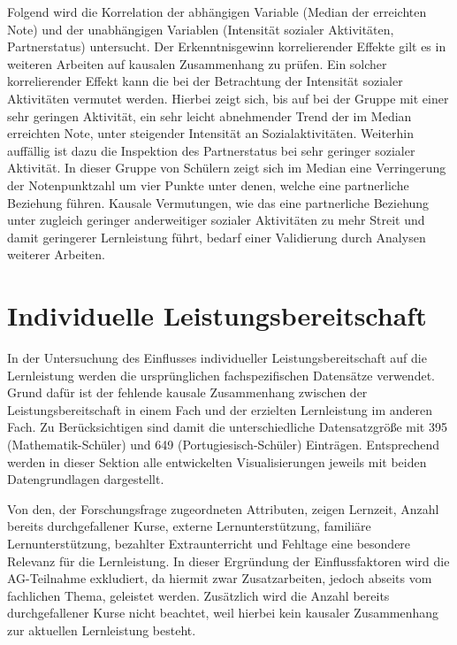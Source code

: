 Folgend wird die Korrelation der abhängigen Variable ({Median der erreichten Note}) und der unabhängigen Variablen ({Intensität sozialer Aktivitäten}, {Partnerstatus}) untersucht.
Der Erkenntnisgewinn korrelierender Effekte gilt es in weiteren Arbeiten auf kausalen Zusammenhang zu prüfen.
Ein solcher korrelierender Effekt kann die bei der Betrachtung der Intensität sozialer Aktivitäten vermutet werden. 
Hierbei zeigt sich, bis auf bei der Gruppe mit einer sehr geringen Aktivität, ein sehr leicht abnehmender Trend der im Median erreichten Note, unter steigender Intensität an Sozialaktivitäten.
Weiterhin auffällig ist dazu die Inspektion des Partnerstatus bei sehr geringer sozialer Aktivität.
In dieser Gruppe von Schülern zeigt sich im Median eine Verringerung der Notenpunktzahl um vier Punkte unter denen, welche eine partnerliche Beziehung führen.
Kausale Vermutungen, wie das eine partnerliche Beziehung unter zugleich geringer anderweitiger sozialer Aktivitäten zu mehr Streit und damit geringerer Lernleistung führt, bedarf einer Validierung durch Analysen weiterer Arbeiten.


\section{Individuelle Leistungsbereitschaft}

In der Untersuchung des Einflusses individueller Leistungsbereitschaft auf die Lernleistung werden die ursprünglichen fachspezifischen Datensätze verwendet.
Grund dafür ist der fehlende kausale Zusammenhang zwischen der Leistungsbereitschaft in einem Fach und der erzielten Lernleistung im anderen Fach.
Zu Berücksichtigen sind damit die unterschiedliche Datensatzgröße mit 395 (Mathematik-Schüler) und 649 (Portugiesisch-Schüler) Einträgen.
Entsprechend werden in dieser Sektion alle entwickelten Visualisierungen jeweils mit beiden Datengrundlagen dargestellt.

Von den, der Forschungsfrage zugeordneten Attributen, zeigen Lernzeit, Anzahl bereits durchgefallener Kurse, externe Lernunterstützung, familiäre Lernunterstützung, bezahlter Extraunterricht und Fehltage eine besondere Relevanz für die Lernleistung. 
In dieser Ergründung der Einflussfaktoren wird die AG-Teilnahme exkludiert, da hiermit zwar Zusatzarbeiten, jedoch abseits vom fachlichen Thema, geleistet werden.
Zusätzlich wird die Anzahl bereits durchgefallener Kurse nicht beachtet, weil hierbei kein kausaler Zusammenhang zur aktuellen Lernleistung besteht.
\clearpage

